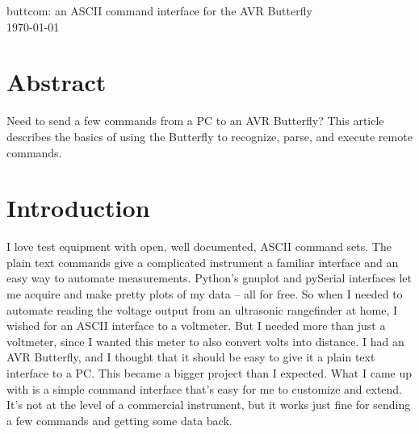 
\graphicspath{
              {figs/} %
              {pngs/} %
}

\newcommand{\isdraft}{0} %






\begin{center}
	{\huge buttcom: an ASCII command interface for the AVR Butterfly}\\
	\today
\end{center}

\section{Abstract}
Need to send a few commands from a PC to an AVR Butterfly?  This article describes the basics of using the Butterfly to recognize, parse, and execute remote commands.  

\section{Introduction}
I love test equipment with open, well documented, ASCII command sets.  The plain text commands give a complicated instrument a familiar interface and an easy way to automate measurements.  Python's gnuplot and pySerial interfaces let me acquire and make pretty plots of my data -- all for free\cite{pyserial,gnuplot-py}. So when I needed to automate reading the voltage output from an ultrasonic rangefinder at home, I wished for an ASCII interface to a voltmeter.  But I needed more than just a voltmeter, since I wanted this meter to also convert volts into distance.  I had an AVR Butterfly, and I thought that it should be easy to give it a plain text interface to a PC.  This became a bigger project than I expected.  What I came up with is a simple command interface that's easy for me to customize and extend.  It's not at the level of a commercial instrument, but it works just fine for sending a few commands and getting some data back.

